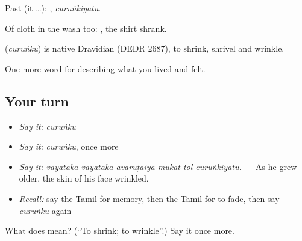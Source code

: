 Past (it …): , \emph{curuṅkiyatu}.

Of cloth in the wash too:  , the shirt shrank.

\begin{cousinweb}
\textbf{} (\emph{curuṅku}) is native Dravidian (DEDR 2687), to shrink, shrivel and wrinkle.
\end{cousinweb}

\begin{grammarlens}[title={What you've built}]
One more word for describing what you lived and felt.
\end{grammarlens}

\subsection*{Your turn}
\begin{itemize}
\raggedright
  \item \emph{Say it:} \emph{curuṅku}
  \item \emph{Say it:} \emph{curuṅku}, once more
  \item \emph{Say it:} \emph{vayatāka vayatāka avaruṭaiya mukat tōl curuṅkiyatu.} — As he grew older, the skin of his face wrinkled.
  \item \emph{Recall:} say the Tamil for memory, then the Tamil for to fade, then say \emph{curuṅku} again
\end{itemize}

\begin{tcolorbox}[breakable,colback=teal!4,colframe=teal!35!black,title={Before you move on}]
What does  mean? (\textquotedblleft{}To shrink; to wrinkle\textquotedblright{}.) Say it once more.
\end{tcolorbox}
